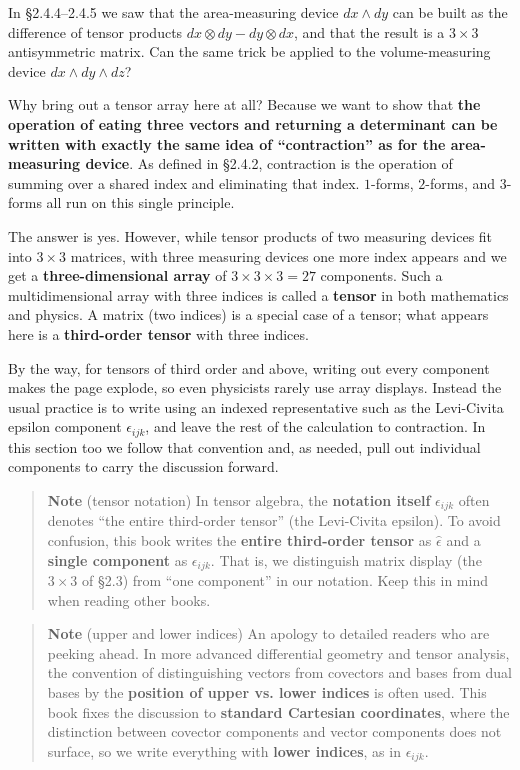In §2.4.4--2.4.5 we saw that the area-measuring device \(dx \wedge dy\)
can be built as the difference of tensor products
\(dx \otimes dy - dy \otimes dx\), and that the result is a
\(3 \times 3\) antisymmetric matrix. Can the same trick be applied to
the volume-measuring device \(dx \wedge dy \wedge dz\)?

Why bring out a tensor array here at all? Because we want to show that
\textbf{the operation of eating three vectors and returning a determinant can be written with exactly the same idea of “contraction” as for the area-measuring device}.
As defined in §2.4.2, contraction is the operation of summing over a
shared index and eliminating that index. \(1\)-forms, \(2\)-forms, and
\(3\)-forms all run on this single principle.

The answer is yes. However, while tensor products of two measuring
devices fit into \(3 \times 3\) matrices, with three measuring devices
one more index appears and we get a \textbf{three-dimensional array} of
\(3 \times 3 \times 3 = 27\) components. Such a multidimensional array
with three indices is called a \textbf{tensor} in both mathematics and
physics. A matrix (two indices) is a special case of a tensor; what
appears here is a \textbf{third-order tensor} with three indices.

By the way, for tensors of third order and above, writing out every
component makes the page explode, so even physicists rarely use array
displays. Instead the usual practice is to write using an indexed
representative such as the Levi-Civita epsilon component
\(\epsilon_{ijk}\), and leave the rest of the calculation to
contraction. In this section too we follow that convention and, as
needed, pull out individual components to carry the discussion forward.

\begin{quote}
\textbf{Note} (tensor notation) In tensor algebra, the
\textbf{notation itself} \(\epsilon_{ijk}\) often denotes ``the entire
third-order tensor'' (the Levi-Civita epsilon). To avoid confusion, this
book writes the \textbf{entire third-order tensor} as
\(\widehat{\epsilon}\) and a \textbf{single component} as
\(\epsilon_{ijk}\). That is, we distinguish matrix display (the
\(3\times3\) of §2.3) from ``one component'' in our notation. Keep this
in mind when reading other books.
\end{quote}

\begin{quote}
\textbf{Note} (upper and lower indices) An apology to detailed readers
who are peeking ahead. In more advanced differential geometry and tensor
analysis, the convention of distinguishing vectors from covectors and
bases from dual bases by the
\textbf{position of upper vs. lower indices} is often used. This book
fixes the discussion to \textbf{standard Cartesian coordinates}, where
the distinction between covector components and vector components does
not surface, so we write everything with \textbf{lower indices}, as in
\(\epsilon_{ijk}\).
\end{quote}

